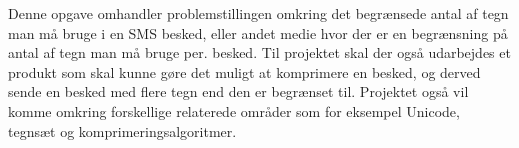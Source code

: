 Denne opgave omhandler problemstillingen omkring det begrænsede antal af tegn man må bruge i en SMS besked, eller andet medie hvor der er en begrænsning på antal af tegn man må bruge per. besked. Til projektet skal der også udarbejdes et produkt som skal kunne gøre det muligt at komprimere en besked, og derved sende en besked med flere tegn end den er begrænset til. Projektet også vil komme omkring forskellige relaterede områder som for eksempel Unicode, tegnsæt og komprimeringsalgoritmer.